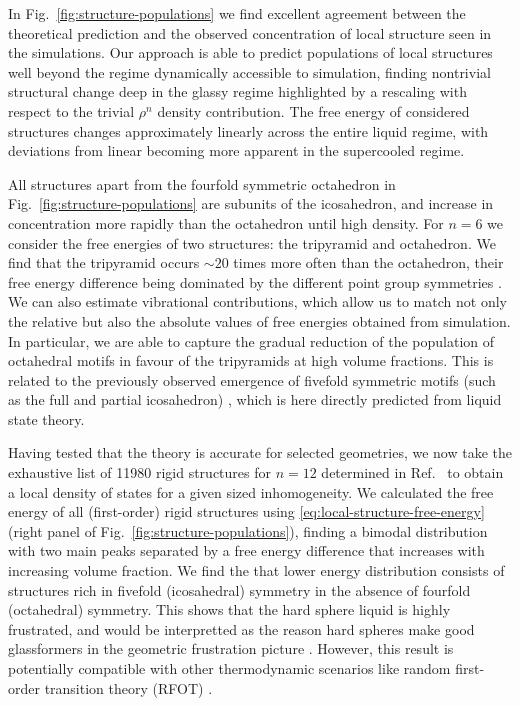 \documentclass[11pt,twoside]{report}
\begin{document}
In Fig.\ \ref{fig:structure-populations} we find excellent agreement between the theoretical prediction and the observed concentration of local structure seen in the simulations.
Our approach is able to predict populations of local structures well beyond the regime dynamically accessible to simulation, finding nontrivial structural change deep in the glassy regime highlighted by a rescaling with respect to the trivial $\rho^n$ density contribution.
The free energy of considered structures changes approximately linearly across the entire liquid regime, with deviations from linear becoming more apparent in the supercooled regime.

All structures apart from the fourfold symmetric octahedron in Fig.\ \ref{fig:structure-populations} are subunits of the icosahedron, and increase in concentration more rapidly than the octahedron until high density.
For $n=6$ we consider the free energies of two structures: the tripyramid and octahedron.
We find that the tripyramid occurs $\sim20$ times more often than the octahedron, their free energy difference being dominated by the different point group symmetries \cite{MalinsJPCM2009,MengS2010,CatesSM2015}.
We can also estimate vibrational contributions, which allow us to match not only the relative but also the absolute values of free energies obtained from simulation.
In particular, we are able to capture the gradual reduction of the population of octahedral motifs in favour of the tripyramids at high volume fractions.
This is related to the previously observed emergence of fivefold symmetric motifs (such as the full and partial icosahedron) \cite{RoyallPR2015,TarjusJPCM2005,HallettNC2018,DunleavyNC2015}, which is here directly predicted from liquid state theory.

Having tested that the theory is accurate for selected geometries, we now take the exhaustive list of 11980 rigid structures for $n=12$ determined in Ref.\ \cite{Holmes-CerfonSR2016} to obtain a local density of states for a given sized inhomogeneity.
We calculated the free energy of all (first-order) rigid structures using \eqref{eq:local-structure-free-energy} (right panel of Fig.\ \ref{fig:structure-populations}), finding a bimodal distribution with two main peaks separated by a free energy difference that increases with increasing volume fraction.
We find the that lower energy distribution consists of structures rich in fivefold (icosahedral) symmetry in the absence of fourfold (octahedral) symmetry.
This shows that the hard sphere liquid is highly frustrated, and would be interpretted as the reason hard spheres make good glassformers in the geometric frustration picture \cite{KivelsonPA1995,TarjusJPCM2005}.
However, this result is potentially compatible with other thermodynamic scenarios like random first-order transition theory (RFOT) \cite{LubchenkoARPC2007}.
\end{document}
